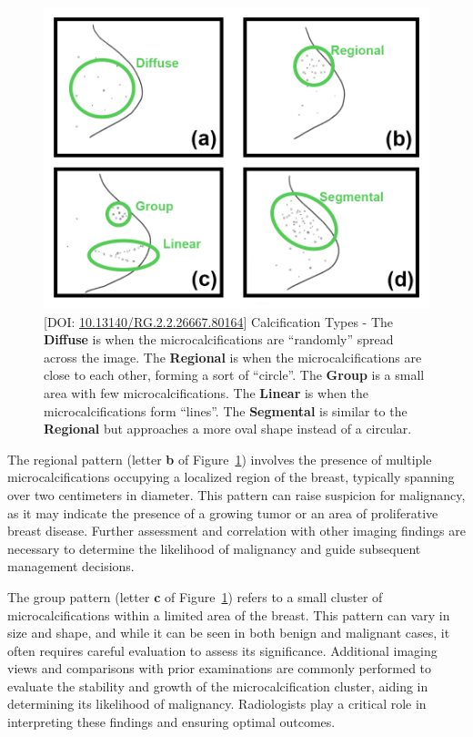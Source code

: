 \begin{figure}[ht]
\centering
\includegraphics[width=\columnwidth]{images/fig022}
\caption{[DOI: \href{https://doi.org/10.13140/RG.2.2.26667.80164}{10.13140/RG.2.2.26667.80164}] Calcification Types - The {\bf Diffuse} is when the microcalcifications are ``randomly'' spread across the image. The {\bf Regional} is when the microcalcifications are close to each other, forming a sort of ``circle''. The {\bf Group} is a small area with few microcalcifications. The {\bf Linear} is when the microcalcifications form ``lines''. The {\bf Segmental} is similar to the {\bf Regional} but approaches a more oval shape instead of a circular.}
\label{fig:fig022}
\end{figure}

The regional pattern (letter {\bf b} of Figure~\ref{fig:fig022}) involves the presence of multiple microcalcifications occupying a localized region of the breast, typically spanning over two centimeters in diameter.
This pattern can raise suspicion for malignancy, as it may indicate the presence of a growing tumor or an area of proliferative breast disease.
Further assessment and correlation with other imaging findings are necessary to determine the likelihood of malignancy and guide subsequent management decisions.

The group pattern (letter {\bf c} of Figure~\ref{fig:fig022}) refers to a small cluster of microcalcifications within a limited area of the breast.
This pattern can vary in size and shape, and while it can be seen in both benign and malignant cases, it often requires careful evaluation to assess its significance.
Additional imaging views and comparisons with prior examinations are commonly performed to evaluate the stability and growth of the microcalcification cluster, aiding in determining its likelihood of malignancy.
Radiologists play a critical role in interpreting these findings and ensuring optimal outcomes.


